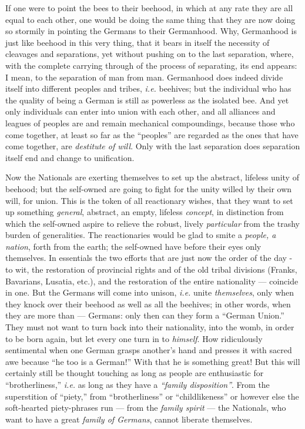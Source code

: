 If one were to point the bees to their beehood, in which at any rate they are 
all equal to each other, one would be doing the same thing that they are now 
doing so stormily in pointing the Germans to their Germanhood. Why, Germanhood 
is just like beehood in this very thing, that it bears in itself the necessity 
of cleavages and separations, yet without pushing on to the last separation, 
where, with the complete carrying through of the process of separating, its 
end appears: I mean, to the separation of man from man. Germanhood does indeed 
divide itself into different peoples and tribes, \textit{i.e.} beehives; but 
the individual who has the quality of being a German is still as powerless as 
the isolated bee. And yet only individuals can enter into union with each 
other, and all alliances and leagues of peoples are and remain mechanical 
compoundings, because those who come together, at least so far as the 
``peoples'' are regarded as the ones that have come together, are 
\textit{destitute of will}. Only with the last separation does separation 
itself end and change to unification.

Now the Nationals are exerting themselves to set up the abstract, lifeless 
unity of beehood; but the self-owned are going to fight for the unity willed 
by their own will, for union. This is the token of all reactionary wishes, 
that they want to set up something \textit{general}, abstract, an empty, 
lifeless \textit{concept}, in distinction from which the self-owned aspire to 
relieve the robust, lively \textit{particular} from the trashy burden of 
generalities. The reactionaries would be glad to smite a \textit{people, a 
nation}, forth from the earth; the self-owned have before their eyes only 
themselves. In essentials the two efforts that are just now the order of the 
day - to wit, the restoration of provincial rights and of the old tribal 
divisions (Franks, Bavarians, Lusatia, etc.), and the restoration of the 
entire nationality --- coincide in one. But the Germans will come into unison, 
\textit{i.e.} unite \textit{themselves}, only when they knock over their 
beehood as well as all the beehives; in other words, when they are more than --- Germans: only then can they form a ``German Union.'' They must not want 
to turn back into their nationality, into the womb, in order to be born again, 
but let every one turn in to \textit{himself}. How ridiculously sentimental 
when one German grasps another's hand and presses it with sacred awe because 
``he too is a German!'' With that he is something great! But this will 
certainly still be thought touching as long as people are enthusiastic for 
``brotherliness,'' \textit{i.e.} as long as they have a \textit{``family 
disposition''}. From the superstition of ``piety,'' from 
``brotherliness'' or ``childlikeness'' or however else the soft-hearted 
piety-phrases run --- from the \textit{family spirit} --- the Nationals, who 
want to have a great \textit{family of Germans}, cannot liberate themselves.

